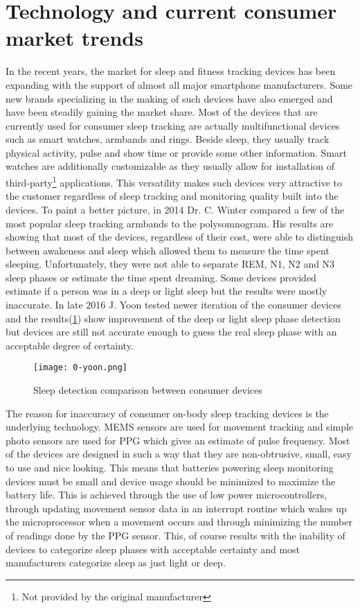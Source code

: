 \section{Technology and current consumer market trends}

In the recent years, the market for sleep and fitness tracking devices has been expanding with the support of almost all major smartphone manufacturers. Some new brands specializing in the making of such devices have also emerged and have been steadily gaining the market share. Most of the devices that are currently used for consumer sleep tracking are actually multifunctional devices such as smart watches, armbands and rings. Beside sleep, they usually track physical activity, pulse and show time or provide some other information. Smart watches are additionally customizable as they usually allow for installation of third-party\footnote{Not provided by the original manufacturer} applications. This versatility makes such devices very attractive to the customer regardless of sleep tracking and monitoring quality built into the devices. To paint a better picture, in 2014 Dr. C. Winter compared a few of the most popular sleep tracking armbands to the polysomnogram\cite{Winter}. His results are showing that most of the devices, regardless of their cost, were able to distinguish between awakeness and sleep which allowed them to measure the time spent sleeping. Unfortunately, they were not able to separate REM, N1, N2 and N3 sleep phases or estimate the time spent dreaming. Some devices provided estimate if a person was in a deep or light sleep but the results were mostly inaccurate. In late 2016 J. Yoon tested newer iteration of the consumer devices and the results(\ref{fig:yoon}) show improvement of the deep or light sleep phase detection but devices are still not accurate enough to guess the real sleep phase with an acceptable degree of certainty\cite{Yoon}.


\begin{figure}[h]
  \begin{center}
    \texttt{[image: 0-yoon.png]}
  \end{center}
  \caption{Sleep detection comparison between consumer devices}
  \label{fig:yoon}
\end{figure}

The reason for inaccuracy of consumer on-body sleep tracking devices is the underlying technology. \ac{MEMS} sensors are used for movement tracking and simple photo sensors are used for \ac{PPG} which gives an estimate of pulse frequency. Most of the devices are designed in such a way that they are non-obtrusive, small, easy to use and nice looking. This means that batteries powering sleep monitoring devices must be small and device usage should be minimized to maximize the battery life. This is achieved through the use of low power microcontrollers, through updating movement sensor data in an interrupt routine which wakes up the microprocessor when a movement occurs and through minimizing the number of readings done by the \ac{PPG} sensor. This, of course results with the inability of devices to categorize sleep phases with acceptable certainty and most manufacturers categorize sleep as just light or deep.


